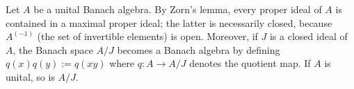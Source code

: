 Let $A$ be a unital Banach algebra. By Zorn's lemma, every proper ideal of $A$ is contained in a maximal proper ideal; the latter is necessarily closed, because $A^{(-1)}$ (the set of invertible elements) is open. Moreover, if $J$ is a closed ideal of $A$, the Banach space $A/J$ becomes a Banach algebra by defining $q(x)q(y) := q(xy)$ where $q : A \to A/J$ denotes the quotient map. If $A$ is unital, so is $A/J$.
